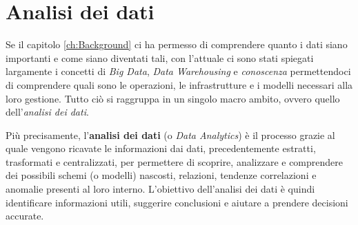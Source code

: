 \section{Analisi dei dati}

Se il capitolo \ref{ch:Background} ci ha permesso di comprendere quanto i dati siano importanti e come siano diventati tali, con l'attuale ci sono stati spiegati largamente i concetti di \textit{Big Data}, \textit{Data Warehousing} e \textit{conoscenza} permettendoci di comprendere quali sono le operazioni, le infrastrutture e i modelli necessari alla loro gestione. Tutto ciò si raggruppa in un singolo macro ambito, ovvero quello dell'\textit{analisi dei dati}.

Più precisamente, l'\textbf{analisi dei dati} (o \textit{Data Analytics}) è il processo grazie al quale vengono ricavate le informazioni dai dati, precedentemente estratti, trasformati e centralizzati, per permettere di scoprire, analizzare e comprendere dei possibili schemi (o modelli) nascosti, relazioni, tendenze correlazioni e anomalie presenti al loro interno. L'obiettivo dell'analisi dei dati è quindi identificare informazioni utili, suggerire conclusioni e aiutare a prendere decisioni accurate.\cite{talend_data_analytics}


